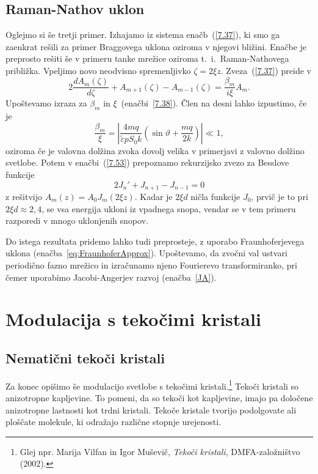 \subsection*{Raman-Nathov uklon}
Oglejmo si še tretji primer. Izhajamo iz sistema enačb~(\ref{7.37}), ki smo ga 
zaenkrat rešili za primer Braggovega uklona oziroma v njegovi bližini. 
Enačbe je preprosto rešiti še v primeru tanke mrežice oziroma t.\ i.\ Raman-Nathovega približka. 
Vpeljimo novo neodvisno spremenljivko $\zeta=2\xi z$. 
Zveza~(\ref{7.37})
preide v 
\begin{equation}
2\frac{dA_{m}(\zeta)}{d\zeta}+A_{m+1}(\zeta)-A_{m-1}(\zeta)=\frac{\beta_{m}}{i\xi}A_{m}.
\label{7.53}
\end{equation}
Upoštevamo izraza za $\beta_m$ in $\xi$~(enačbi~\ref{7.38}). Člen na desni lahko izpustimo, če je 
\begin{equation}
\frac{\beta_{m}}{\xi}=\left| \frac{4mq}{\tilde{\varepsilon}pS_0k}\left(\sin\vartheta+\frac{mq}{2k}\right)\right| 
\ll 1,
\label{7.54}
\end{equation}
oziroma če je valovna dolžina zvoka dovolj velika v primerjavi z valovno dolžino svetlobe. Potem 
v enačbi~(\ref{7.53}) prepoznamo rekurzijsko zvezo za Besslove funkcije 
\begin{equation}
2J_{n}'+J_{n+1}-J_{n-1}=0
\label{7.55}
\end{equation}
z rešitvijo $A_{m}(z)=A_{0}J_{m}(2\xi z)$. Kadar je $2\xi d$ ničla funkcije
$J_{0}$, prvič je to pri $2\xi d\approx 2,4$, se vsa energija ukloni iz
vpadnega snopa, vendar se v tem primeru 
razporedi v mnogo uklonjenih snopov.
\begin{remark}
Do istega rezultata pridemo lahko tudi preprosteje, z uporabo Fraunhoferjevega uklona
(enačba~\ref{eq:FraunhoferApprox}). Upoštevamo, da zvočni val ustvari periodično fazno 
mrežico in izračunamo njeno Fourierevo transformiranko, pri čemer uporabimo 
Jacobi-Angerjev razvoj (enačba~\ref{JA}). 
\end{remark}

\section{Modulacija s tekočimi kristali}

\subsection*{Nematični tekoči kristali}
Za konec opišimo še modulacijo svetlobe s tekočimi kristali.\footnote{Glej npr.
Marija Vilfan in Igor Muševič, {\it Tekoči kristali}, DMFA-založništvo (2002).} 
Tekoči kristali so anizotropne kapljevine. To pomeni, da so tekoči kot 
kapljevine, imajo pa določene anizotropne lastnosti kot trdni kristali. 
Tekoče kristale tvorijo podolgovate ali ploščate molekule, 
ki odražajo različne stopnje urejenosti. 

